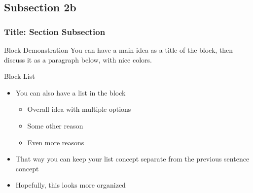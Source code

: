 \subsection{Subsection 2b}

\begin{frame}
\frametitle{Title: Section \thesection Subsection \thesubsection}
\begin{block}{Block Demonstration}
You can have a main idea as a title of the block, then discuss it as a paragraph below, with nice colors.
\end{block}
\begin{block}{Block List}
    \begin{itemize}
      \item You can also have a list in the block
        \begin{itemize}
          \item Overall idea with multiple options
          \item Some other reason
          \item Even more reasons
        \end{itemize}
      \item That way you can keep your list concept separate from the previous sentence concept
      \item Hopefully, this looks more organized
    \end{itemize}
\end{block}
\end{frame}

